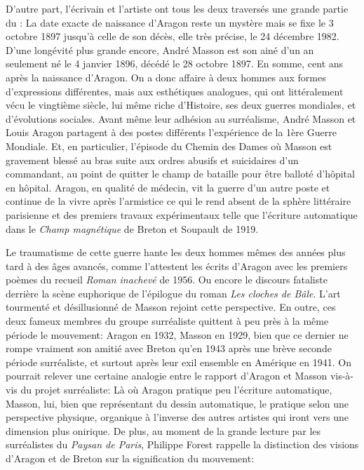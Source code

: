 D’autre part, l’écrivain et l’artiste ont tous les deux traversés une grande partie du : La date exacte de naissance d’Aragon reste un mystère mais se fixe le 3 octobre 1897 jusqu’à celle de son décès, elle très précise, le 24 décembre 1982. D’une longévité plus grande encore, André Masson est son ainé d’un an seulement né le 4 janvier 1896, décédé le 28 octobre 1897. En somme, cent ans après la naissance d’Aragon. On a donc affaire à deux hommes aux formes d’expressions différentes, mais aux esthétiques analogues, qui ont littéralement vécu le vingtième siècle, lui même riche d’Histoire, ses deux guerres mondiales, et d’évolutions sociales. Avant même leur adhésion au surréalisme, André Masson et Louis Aragon partagent à des postes différents l’expérience de la 1ère Guerre Mondiale. Et, en particulier, l’épisode du Chemin des Dames où Masson est gravement blessé au bras suite aux ordres abusifs et suicidaires d’un commandant, au point de quitter le champ de bataille pour être balloté d’hôpital en hôpital. Aragon, en qualité de médecin, vit la guerre d’un autre poste et continue de la vivre après l’armistice ce qui le rend absent de la sphère littéraire parisienne et des premiers travaux expérimentaux telle que l’écriture automatique dans le \emph{Champ magnétique} de Breton et Soupault de 1919.

Le traumatisme de cette guerre hante les deux hommes mêmes des années plus tard à des âges avancés, comme l’attestent les écrits d’Aragon avec les premiers poèmes du recueil \emph{Roman inachevé} de 1956. Ou encore  le discours fataliste derrière la scène euphorique de l’épilogue du roman \emph{Les cloches de Bâle}. L’art tourmenté et désillusionné de Masson rejoint cette perspective. En outre, ces deux fameux membres du groupe surréaliste quittent à peu près à la même période le mouvement: Aragon en 1932, Masson en 1929, bien que ce dernier ne rompe vraiment son amitié avec Breton qu’en 1943 après une brève seconde période surréaliste, et surtout après leur exil ensemble en Amérique en 1941. On pourrait relever une certaine analogie entre le rapport d’Aragon et Masson vis-à-vis du projet surréaliste: Là où Aragon pratique peu l’écriture automatique, Masson, lui, bien que représentant du dessin automatique, le pratique selon une perspective physique, organique à l’inverse des autres artistes qui iront vers une dimension plus onirique. De plus, au moment de la grande lecture par les surréalistes du \emph{Paysan de Paris}, Philippe Forest rappelle la distinction des visions d’Aragon et de Breton sur la signification du mouvement: 

